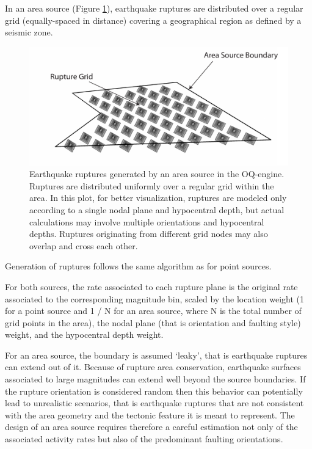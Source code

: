 In an area source (Figure \ref{fig:AreaSource}), earthquake ruptures are distributed over a regular grid (equally-spaced in distance) covering a geographical region as defined by a seismic zone. 
\begin{figure}
\centering
\includegraphics[width=14cm]{./Pictures/AreaSource.pdf}
\caption{Earthquake ruptures generated by an area source in the OQ-engine. Ruptures are distributed uniformly over a regular grid within the area. In this plot, for better visualization, ruptures are modeled only according to a single nodal plane and hypocentral depth, but actual calculations may involve multiple orientations and hypocentral depths. Ruptures originating from different grid nodes may also overlap and cross each other.}
\label{fig:AreaSource}
\end{figure}
Generation of ruptures follows the same algorithm as for point sources.

For both sources, the rate associated to each rupture plane is the original rate associated to the corresponding magnitude bin, scaled by the location weight (1 for a point source and 1 / N for an area source, where N is the total number of grid points in the area), the nodal plane (that is orientation and faulting style) weight, and the hypocentral depth weight.

For an area source, the boundary is assumed ‘leaky’, that is earthquake ruptures can extend out of it. Because of rupture area conservation, earthquake surfaces associated to large magnitudes can extend well beyond the source boundaries. If the rupture orientation is considered random then this behavior can potentially lead to unrealistic scenarios, that is earthquake ruptures that are not consistent with the area geometry and the tectonic feature it is meant to represent. The design of an area source requires therefore a careful estimation not only of the associated activity rates but also of the predominant faulting orientations.

